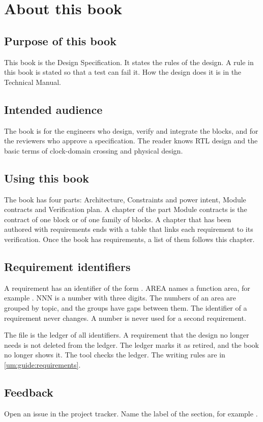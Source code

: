\chapter*{About this book}
{}
\label{ds:ch:about}

\section*{Purpose of this book}
This book is the Design Specification. It states the rules of the design. A rule in this book is stated so that a test can fail it. How the design does it is in the Technical Manual.


\section*{Intended audience}
The book is for the engineers who design, verify and integrate the blocks, and for the reviewers who approve a specification. The reader knows RTL design and the basic terms of clock-domain crossing and physical design.

\section*{Using this book}
The book has four parts: Architecture, Constraints and power intent, Module contracts and Verification plan. A chapter of the part Module contracts is the contract of one block or of one family of blocks. A chapter that has been authored with requirements ends with a table that links each requirement to its verification. Once the book has requirements, a list of them follows this chapter.



\section*{Requirement identifiers}
A requirement has an identifier of the form . AREA names a function area, for example . NNN is a number with three digits. The numbers of an area are grouped by topic, and the groups have gaps between them. The identifier of a requirement never changes. A number is never used for a second requirement.

The file  is the ledger of all identifiers. A requirement that the design no longer needs is not deleted from the ledger. The ledger marks it as retired, and the book no longer shows it. The tool  checks the ledger. The writing rules are in \cref{um:guide:requirements}.

\section*{Feedback}
Open an issue in the project tracker. Name the label of the section, for example .
